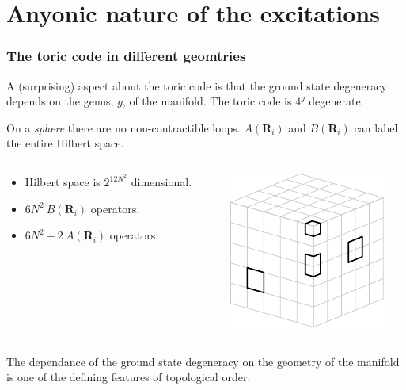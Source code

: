 \documentclass{beamer}
\renewcommand{\(}{\left(}
\renewcommand{\)}{\right)}
\renewcommand{\[}{\left[}
\renewcommand{\]}{\right]}
\begin{document}
\section{Anyonic nature of the excitations}
\begin{frame}
    \frametitle{The toric code in different geomtries}
    A (surprising) aspect about the toric code is that the ground state degeneracy depends on the genus, $g$, of the manifold. The toric code is $4^g$ degenerate. 
    
    \pause
    On a \emph{sphere} there are no non-contractible loops. $A(\bm R_i)$ and $B(\bm R_i)$ can label the entire Hilbert space. 
    \begin{columns}
        \begin{column}{0.5\textwidth}
            \begin{itemize}
                \item Hilbert space is $2^{12N^2}$ dimensional.
                \item $6N^2 \ B(\bm R_i)$ operators.
                \item $6N^2 + 2 \ A(\bm R_i)$ operators.
            \end{itemize}
        \end{column}
        \begin{column}{0.5\textwidth}
            \centering
            \includegraphics[scale=1.1]{toric_on_sphere.pdf}
        \end{column}
    \end{columns}
    \pause
    \begin{framed}
        The dependance of the ground state degeneracy on the geometry of the manifold is one of the defining features of topological order. 
    \end{framed}
\end{frame}
\end{document}
